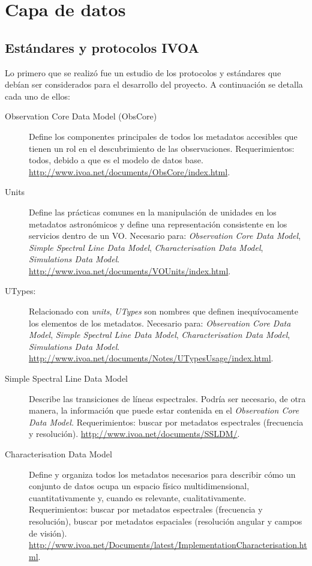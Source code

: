 \chapter{Capa de datos}

\section{Estándares y protocolos IVOA}

Lo primero que se realizó fue un estudio de los protocolos y estándares que debían ser considerados para el desarrollo del proyecto. A continuación se detalla cada uno de ellos:

\begin{description}
	\item[Observation Core Data Model (ObsCore)] Define los componentes principales de todos los metadatos accesibles que tienen un rol en el descubrimiento de las observaciones. Requerimientos: todos, debido a que es el modelo de datos base. \url{http://www.ivoa.net/documents/ObsCore/index.html}.
	\item[Units] Define las prácticas comunes en la manipulación de unidades en los metadatos astronómicos y define una representación consistente en los servicios dentro de un VO. Necesario para: \emph{Observation Core Data Model}, \emph{Simple Spectral Line Data Model}, \emph{Characterisation Data Model}, \emph{Simulations Data Model}. \url{http://www.ivoa.net/documents/VOUnits/index.html}.
	\item[UTypes:] Relacionado con \emph{units}, \emph{UTypes} son nombres que definen inequívocamente los elementos de los metadatos. Necesario para: \emph{Observation Core Data Model}, \emph{Simple Spectral Line Data Model}, \emph{Characterisation Data Model}, \emph{Simulations Data Model}. \url{http://www.ivoa.net/documents/Notes/UTypesUsage/index.html}.
	\item[Simple Spectral Line Data Model] Describe las transiciones de líneas espectrales. Podría ser necesario, de otra manera, la información que puede estar contenida en el \emph{Observation Core Data Model.} Requerimientos: buscar por metadatos espectrales (frecuencia y resolución). \url{http://www.ivoa.net/documents/SSLDM/}.
	\item[Characterisation Data Model] Define y organiza todos los metadatos necesarios para describir cómo un conjunto de datos ocupa un espacio físico multidimensional, cuantitativamente y, cuando es relevante, cualitativamente. Requerimientos: buscar por metadatos espectrales (frecuencia y resolución), buscar por metadatos espaciales (resolución angular y campos de visión). \url{http://www.ivoa.net/Documents/latest/ImplementationCharacterisation.html}.

\end{description}
